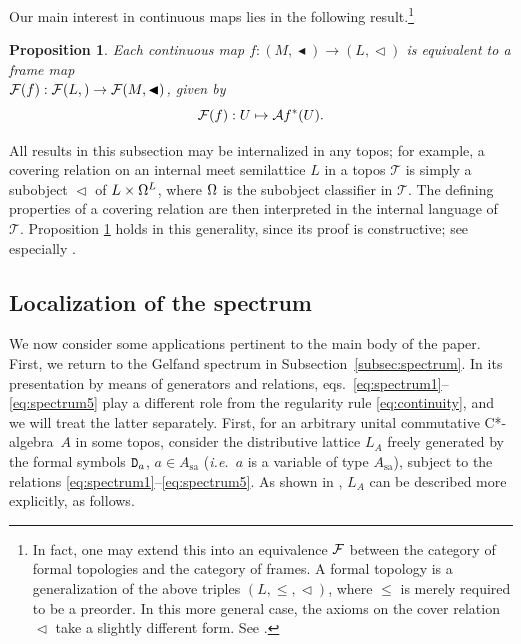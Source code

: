 \documentclass[12pt]{article}
\newcommand{\drie}{\vartriangleleft}
\newcommand{\coveredd}{\ensuremath{\mathop{\blacktriangleleft}}}
\newcommand{\beq}{\begin{equation}}
\newcommand{\eeq}{\end{equation}}
\newcommand{\ca}{C*-algebra} \newcommand{\jba}{JB-algebra}
\newcommand{\raw}{\rightarrow} \newcommand{\rat}{\mapsto}
\newcommand{\x}{\times} \newcommand{\hb}{\hbar}
\newcommand{\er}{\eqref}
\newcommand{\CT}{{\mathcal T}} \newcommand{\CV}{{\mathcal V}}
\newcommand{\sa}{\ensuremath{_{\mathrm{sa}}}}
\newcommand{\prop}[1]{\ensuremath{\mbox{\texttt{#1}}}}
\newcommand{\ie}{\textit{i.e.}}
\newtheorem{proposition}[theorem]{Proposition}
\begin{document}
Our main interest in continuous maps lies in the following result.\footnote{
In fact, one may extend this into an equivalence ${\mathcal F}$ between the category of formal topologies
and the category of frames. A formal topology is a generalization of the above triples
$(L,\leqslant,\drie)$, where $\leqslant$ is merely required to be a preorder. In
this more general case, the axioms on the cover relation $\drie$ take
a slightly different form. See \cite{battilottisambin,negri}.}
\begin{proposition}\label{approxmap}
  Each continuous map  $f:(M,\coveredd)\raw (L,\drie) $ is equivalent  to a
  frame map \\  $\CF(f): \CF(L,\drie)\raw  \CF(M,\coveredd)$, given by
  \beq \CF(f):U\mapsto \mathcal{A}f^*(U).\label{apeq}\eeq
\end{proposition}

All results in this subsection may be internalized in any topos; for example,
a covering relation on an internal meet semilattice $L$ in a topos
$\CT$ is simply a subobject $\drie$ of $L\x\Om^L$, where $\Omega$ is the
subobject classifier in $\CT$. The defining properties of a covering
relation are then interpreted in the internal language of $\CT$.
 Proposition \ref{approxmap} holds in this generality,  since
its proof is constructive; see especially \cite{aczel}.
\subsection{Localization of the spectrum}\label{App:localization}
We now consider some applications pertinent to the main body of the paper.
First, we return to the Gelfand spectrum in
Subsection~\ref{subsec:spectrum}. In its presentation by means of generators and relations,
eqs.\  \er{eq:spectrum1}--\er{eq:spectrum5} play a different role from the regularity rule \er{eq:continuity}, and we will treat the latter separately. First, for an arbitrary unital commutative \ca\ $A$ in some topos, consider
the  distributive lattice $L_A$ freely generated by the formal symbols $\prop{D}_a$, $a\in A\sa$
(\ie\ $a$ is a variable of type $A\sa$), 
subject to the relations \er{eq:spectrum1}--\er{eq:spectrum5}. As shown in \cite{coquand05,
coquandspitters05}, $L_A$ can be described more explicitly, as follows.
\end{document}
